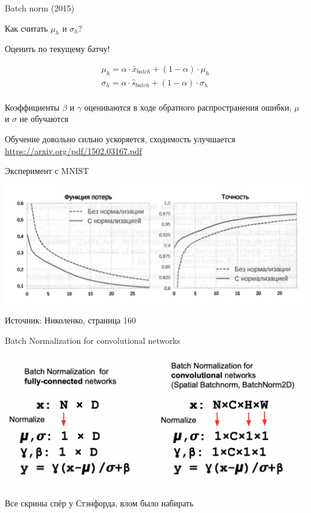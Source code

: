 \documentclass[notes,12pt, aspectratio=169]{beamer}
\newenvironment{wideitemize}{\itemize\addtolength{\itemsep}{10pt}}{\enditemize}
\begin{document}
\begin{frame}{Batch norm (2015)}
	\begin{wideitemize}
		\item  Как считать $\mu_h$ и $\sigma_h$? 
		
		\item Оценить по текущему батчу! 
		
		\begin{align*} 
			\mu_h =  \alpha \cdot \bar x_{batch}  + (1 - \alpha) \cdot \mu_h \\ 
			\sigma_h =  \alpha \cdot \hat s_{batch}  + (1 - \alpha) \cdot \sigma_h \\ 
		\end{align*}
		
		\item Коэффициенты $\beta$ и $\gamma$ оцениваются в ходе обратного распространения ошибки, $\mu$ и $\sigma$ не обучаются
		
		\item Обучение довольно сильно ускоряется, сходимость улучшается 
	\end{wideitemize}
	\vfill %
	\footnotesize
	{\color{blue} \url{https://arxiv.org/pdf/1502.03167.pdf}}
\end{frame}


\begin{frame}{Эксперимент с MNIST}
	\begin{center}
			\includegraphics[width=.8\linewidth]{batch_norm.png}
		\end{center}
	\vfill
	{\small  Источник: Николенко, страница 160}
\end{frame}





\begin{frame}{ Batch Normalization for convolutional networks}
\begin{center}
	\includegraphics[width=.95\linewidth]{st_norm_1.png}
\end{center}
\vfill %
\footnotesize
Все скрины спёр у Стэнфорда, влом было набирать
\end{frame}
\end{document}
